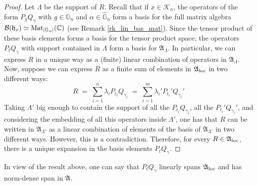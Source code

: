 \documentclass[a4paper,12pt,twoside,reqno]{amsart}
\theoremstyle{plain}
\theoremstyle{definition}
\theoremstyle{remark}
\numberwithin{equation}{section}
\numberwithin{figure}{section}
\numberwithin{table}{section}
\newcommand{\f}[1]{\mathcal{#1}}
\newcommand{\n}[1]{\mathbb{#1}}
\begin{document}
	\begin{proof}
		Let $\Lambda$ be the support of $R$. Recall that if $x \in \f{K}_n$, the operators of the form $P_g Q_\gamma$ with $g \in \n{G}_n$ and $\alpha \in \widehat{\n{G}}_n$ form a basis for the full matrix algebra
		$\f{B}(\mathfrak{h}_x)\simeq{\rm Mat}_{|{\n{G}}_n|}(\n{C})$ (see Remark \ref{rk_lin_bas_mat}). 
		Since the tensor product of these basis elements forms a basis for the tensor product space, the operators $P_t Q_\gamma$ with support contained in \( \Lambda \) form a basis for \( \mathfrak{A}_\Lambda \). In particular, we can express $R$ in a unique way as a (finite) linear combination of operators in $\mathfrak{A}_\Lambda$.
		Now, suppose we can express $R$ as a finite sum of elements in $\mathfrak{A}_{\rm loc}$ in two different ways:
		\[
		R\;=\;\sum_{i=1}^n\lambda_{i}P_{t_i}Q_{\gamma_i}\;=\; \sum_{i=1}^m\lambda_{i}'P_{t_i}'Q_{\gamma_i}'
		\]
		Taking $\Lambda'$ big enough to contain the support of all the $P_{t_i}Q_{\gamma_i}$, all the $P_{t_i}'Q_{\gamma_i}'$, and considering the embedding of all this operators inside $\Lambda'$, one has that $R$ can be written in $\mathfrak{A}_{\Lambda'}$  as a linear combination of elements of the basis of $\mathfrak{A}_{\Lambda'}$ in two different ways. However, this is a contradiction. Therefore, for every $R\in \mathfrak{A}_{\rm loc}$, there is a unique expansion in the basis elements  $P_tQ_\gamma$.
	\end{proof}
	
	
	
	
	\medskip
	
	
	
	
	In view of the result above, one can say that $P_{t}Q_{\gamma}$ linearly spans $\mathfrak{A}_{\rm loc}$ and has norm-dense span in $\mathfrak{A}$.
	
	
	
	
	
	
	
	
	
	\medskip
	
	
	
	
	
	
	
	
	
	
	
	
	
	
	
\end{document}
